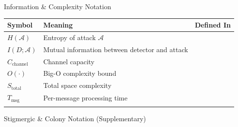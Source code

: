 \documentclass[
  ignorenonframetext,
]{beamer}
\newcounter{none} %
\providecommand{\cref}[1]{\texttt{\detokenize{#1}}}
\begin{document}
\begin{frame}[allowframebreaks]{Information \& Complexity Notation}
{\def\LTcaptype{none} %
\begin{longtable}[]{@{}
  >{\raggedright\arraybackslash}p{}
  >{\raggedright\arraybackslash}p{}
  >{\raggedright\arraybackslash}p{}@{}}
\toprule\noalign{}
\begin{minipage}[b]{\linewidth}\raggedright
Symbol
\end{minipage} & \begin{minipage}[b]{\linewidth}\raggedright
Meaning
\end{minipage} & \begin{minipage}[b]{\linewidth}\raggedright
Defined In
\end{minipage} \\
\midrule\noalign{}
\endhead
\(H(\mathcal{A})\) & Entropy of attack \(\mathcal{A}\) &
\cref{thm:min-entropy} \\
\(I(D; \mathcal{A})\) & Mutual information between detector and attack &
\cref{def:detector-gain} \\
\(C_{\text{channel}}\) & Channel capacity & \cref{thm:stealth-impact} \\
\(O(\cdot)\) & Big-O complexity bound & \cref{sec:complexity-bounds} \\
\(S_{\text{total}}\) & Total space complexity & \cref{eq:total-space} \\
\(T_{\text{msg}}\) & Per-message processing time &
\cref{eq:message-processing} \\
\bottomrule\noalign{}
\end{longtable}
}
\end{frame}

\begin{frame}[allowframebreaks]{Stigmergic \& Colony Notation
(Supplementary)}
\protect{}\label{stigmergic-colony-notation-supplementary}
\end{frame}
\end{document}
